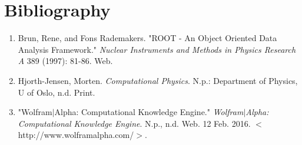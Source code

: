 \documentclass[12pt]{article}
\numberwithin{equation}{section}
\begin{document}
\section{Bibliography}
\label{sec:bib}

\begin{enumerate}

\item Brun, Rene, and Fons Rademakers. "ROOT - An Object Oriented Data Analysis Framework." \textit{Nuclear Instruments and Methods in Physics Research A} 389 (1997): 81-86. Web.
\item Hjorth-Jensen, Morten. \textit{Computational Physics}. N.p.: Department of Physics, U of Oslo, n.d. Print.
\item "Wolfram$|$Alpha: Computational Knowledge Engine." \textit{Wolfram$|$Alpha: Computational Knowledge Engine}. N.p., n.d. Web. 12 Feb. 2016. $<$http://www.wolframalpha.com/$>$.

\end{enumerate}
\end{document}
